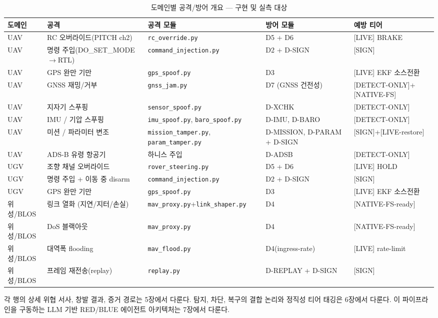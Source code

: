 \begin{table}[t!]
\centering
\caption{도메인별 공격/방어 개요 --- 구현 및 실측 대상}
\label{tab:attack_defense_overview}
\renewcommand{\arraystretch}{1.2}
\scriptsize
\begin{adjustbox}{width=\textwidth}
\begin{tabular}{p{1.3cm} p{3.4cm} p{3.5cm} p{3.0cm} p{2.6cm}}
\toprule
\textbf{도메인} & \textbf{공격} & \textbf{공격 모듈} & \textbf{방어 모듈} & \textbf{예방 티어} \\
\midrule
UAV & RC 오버라이드(PITCH ch2) & \texttt{rc\_override.py} & D5 + D6 & [LIVE] BRAKE \\
UAV & 명령 주입(DO\_SET\_MODE$\to$RTL) & \texttt{command\_injection.py} & D2 + D-SIGN & [SIGN] \\
UAV & GPS 완만 기만 & \texttt{gps\_spoof.py} & D3 & [LIVE] EKF 소스전환 \\
UAV & GNSS 재밍/거부 & \texttt{gnss\_jam.py} & D7 (GNSS 건전성) & [DETECT-ONLY]+[NATIVE-FS] \\
UAV & 지자기 스푸핑 & \texttt{sensor\_spoof.py} & D-XCHK & [DETECT-ONLY] \\
UAV & IMU / 기압 스푸핑 & \texttt{imu\_spoof.py}, \texttt{baro\_spoof.py} & D-IMU, D-BARO & [DETECT-ONLY] \\
UAV & 미션 / 파라미터 변조 & \texttt{mission\_tamper.py}, \texttt{param\_tamper.py} & D-MISSION, D-PARAM + D-SIGN & [SIGN]+[LIVE-restore] \\
UAV & ADS-B 유령 항공기 & 하니스 주입 & D-ADSB & [DETECT-ONLY] \\
\hdashline
UGV & 조향 채널 오버라이드 & \texttt{rover\_steering.py} & D5 + D6 & [LIVE] HOLD \\
UGV & 명령 주입 + 이동 중 disarm & \texttt{command\_injection.py} & D2 + D-SIGN & [SIGN] \\
UGV & GPS 완만 기만 & \texttt{gps\_spoof.py} & D3 & [LIVE] EKF 소스전환 \\
\hdashline
위성/BLOS & 링크 열화 (지연/지터/손실) & \texttt{mav\_proxy.py}+\texttt{link\_shaper.py} & D4 & [NATIVE-FS-ready] \\
위성/BLOS & DoS 블랙아웃 & \texttt{mav\_proxy.py} & D4 & [NATIVE-FS-ready] \\
위성/BLOS & 대역폭 flooding & \texttt{mav\_flood.py} & D4(ingress-rate) & [LIVE] rate-limit \\
위성/BLOS & 프레임 재전송(replay) & \texttt{replay.py} & D-REPLAY + D-SIGN & [SIGN] \\
\bottomrule
\end{tabular}
\end{adjustbox}
\end{table}

각 행의 상세 위협 서사, 창발 결과, 증거 경로는 5장에서 다룬다. 탐지, 차단, 복구의 결합 논리와 정직성 티어 태깅은 6장에서 다룬다. 이 파이프라인을 구동하는 LLM 기반 RED/BLUE 에이전트 아키텍처는 7장에서 다룬다.